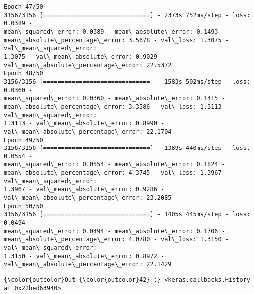 \documentclass[11pt]{article}
\begin{document}
\begin{Verbatim}[commandchars=\\\{\},fontsize=\footnotesize]
Epoch 47/50
3156/3156 [==============================] - 2373s 752ms/step - loss: 0.0389 -
mean\_squared\_error: 0.0389 - mean\_absolute\_error: 0.1493 -
mean\_absolute\_percentage\_error: 3.5678 - val\_loss: 1.3075 - val\_mean\_squared\_error:
1.3075 - val\_mean\_absolute\_error: 0.9029 - val\_mean\_absolute\_percentage\_error: 22.5372
Epoch 48/50
3156/3156 [==============================] - 1583s 502ms/step - loss: 0.0360 -
mean\_squared\_error: 0.0360 - mean\_absolute\_error: 0.1415 -
mean\_absolute\_percentage\_error: 3.3586 - val\_loss: 1.3113 - val\_mean\_squared\_error:
1.3113 - val\_mean\_absolute\_error: 0.8990 - val\_mean\_absolute\_percentage\_error: 22.1704
Epoch 49/50
3156/3156 [==============================] - 1389s 440ms/step - loss: 0.0554 -
mean\_squared\_error: 0.0554 - mean\_absolute\_error: 0.1824 -
mean\_absolute\_percentage\_error: 4.3745 - val\_loss: 1.3967 - val\_mean\_squared\_error:
1.3967 - val\_mean\_absolute\_error: 0.9286 - val\_mean\_absolute\_percentage\_error: 23.2085
Epoch 50/50
3156/3156 [==============================] - 1405s 445ms/step - loss: 0.0494 -
mean\_squared\_error: 0.0494 - mean\_absolute\_error: 0.1706 -
mean\_absolute\_percentage\_error: 4.0780 - val\_loss: 1.3150 - val\_mean\_squared\_error:
1.3150 - val\_mean\_absolute\_error: 0.8972 - val\_mean\_absolute\_percentage\_error: 22.1429

    \end{Verbatim}
\newpage
\begin{Verbatim}[commandchars=\\\{\}]
{\color{outcolor}Out[{\color{outcolor}42}]:} <keras.callbacks.History at 0x22bed63940>
\end{Verbatim}
            
\end{document}
